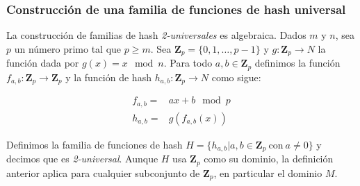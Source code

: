 \documentclass[a4paper,10pt, oneside]{article}
\begin{document}
\subsubsection{Construcción de una familia de funciones de hash universal}
La construcción de familias de hash \textit{2-universales} es algebraica. Dados $m$ y $n$, sea $p$ un número primo tal que $p \geq m$. Sea $\mathbf{Z}_p = \{ 0, 1, \dots, p-1\}$ y $g: \mathbf{Z}_p \rightarrow N$ la función dada por $g(x) = x \mod n$. Para todo $a,b \in \mathbf{Z}_p$ definimos la función $f_{a,b}: \mathbf{Z}_p \rightarrow \mathbf{Z}_p$ y la función de hash $h_{a,b}: \mathbf{Z}_p \rightarrow N$ como sigue:

\begin{equation}
	\begin{array}{ll}
		f_{a,b} = & ax + b \mod p \\
		h_{a,b} = & g(f_{a,b}(x))
	\end{array}
\end{equation}

Definimos la familia de funciones de hash $H = \{ h_{a,b} | a,b \in \mathbf{Z}_p \ \text{con} \ a \neq 0 \}$ y decimos que es \textit{2-universal}. Aunque $H$ usa $\mathbf{Z}_p$ como su dominio, la definición anterior aplica para cualquier subconjunto de $\mathbf{Z}_p$, en particular el dominio $M$.
\end{document}
